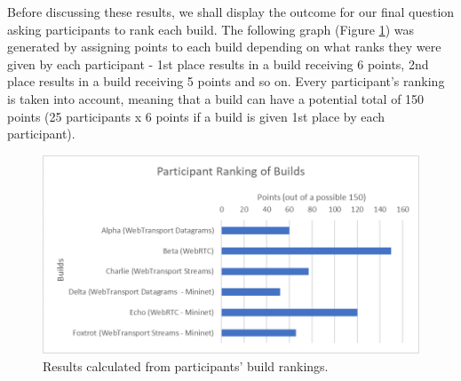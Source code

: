 \begin{table}[H]
\centering
{}
\caption{Participant responses to our survey's Likert scale questions.}
\label{tab:likert-responses}
\end{table}

Before discussing these results, we shall display the outcome for our final question asking participants to rank each build. The following graph (Figure \ref{fig:ranks}) was generated by assigning points to each build depending on what ranks they were given by each participant - 1st place results in a build receiving 6 points, 2nd place results in a build receiving 5 points and so on. Every participant's ranking is taken into account, meaning that a build can have a potential total of 150 points (25 participants x 6 points if a build is given 1st place by each participant).  

\begin{figure}[h]
    \centering
    \includegraphics[width=0.73\linewidth]{images/user-survey-builds-rank.png}    

    \caption{Results calculated from participants' build rankings.}

    \label{fig:ranks} 
\end{figure}

